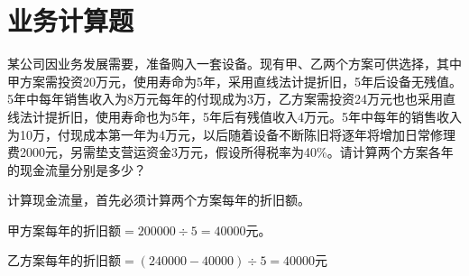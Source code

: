 \documentclass[
  10pt,
  twoside,
  openany,
  b5paper, %
  colorscheme = black, %
  xits = false,
]{qyxf-book}
\begin{document}
\section{业务计算题}
 某公司因业务发展需要，准备购入一套设备。现有甲、乙两个方案可供选择，其中甲方案需投资20万元，使用寿命为5年，采用直线法计提折旧，5年后设备无残值。5年中每年销售收入为8万元每年的付现成为3万，乙方案需投资24万元也也采用直线法计提折旧，使用寿命也为5年，5年后有残值收入4万元。5年中每年的销售收入为10万，付现成本第一年为4万元，以后随着设备不断陈旧将逐年将增加日常修理费2000元，另需垫支营运资金3万元，假设所得税率为40\%。请计算两个方案各年的现金流量分别是多少？
\begin{note}
	计算现金流量，首先必须计算两个方案每年的折旧额。
	
	甲方案每年的折旧额$= 200000 \div 5 = 40000$元。
	
	乙方案每年的折旧额$= (240000 - 40000) \div 5 =40000 $元
	

\end{note}
\end{document}
